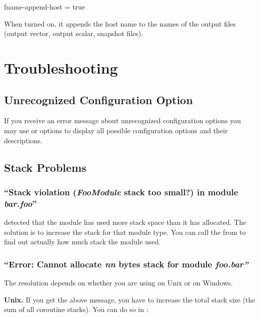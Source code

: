 \begin{inifile}
[General]
fname-append-host = true
\end{inifile}

When turned on, it appends the host name to the names of the output
files (output vector, output scalar, snapshot files).



\section{Troubleshooting}
\label{sec:run-sim:troubleshooting}

\subsection{Unrecognized Configuration Option}
\label{sec:run-sim:unrecognized-configuration-option}

If you receive an error message about unrecognized configuration
options you may use  or  options
to display all possible configuration options and their descriptions.

\subsection{Stack Problems}
\label{sec:run-sim:stack-problems}

\subsubsection{``Stack violation (\textit{FooModule} stack too small?) in module \textit{bar.foo}''}
\label{sec:run-sim:stack-too-small}

{\opp} detected that the module has used more stack space than it has
allocated. The solution is to increase the stack for that module type.
You can call the  from  to find out
actually how much stack the module used.


\subsubsection{``Error: Cannot allocate \textit{nn} bytes stack for module \textit{foo.bar''}}
\label{sec:run-sim:cannot-allocate-stack}

The resolution depends on whether you are using {\opp} on Unix or on Windows.

\textbf{Unix.}
If you get the above message, you have to increase the total stack
size (the sum of all coroutine stacks). You can do
so in :

